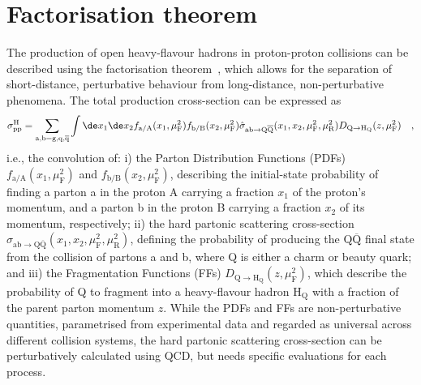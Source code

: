 \section{Factorisation theorem}
The production of open heavy-flavour hadrons in proton-proton collisions can be described using the factorisation theorem~\cite{Collins:1989gx}, which allows for the separation of short-distance, perturbative behaviour from long-distance, non-perturbative phenomena. The total production cross-section can be expressed as
\begin{equation}\label{eq:pp_xsec}
    \sigma_{\text{pp}}^\mathrm{H} = \sum_\mathrm{a,b = g, q, \overline{q}} \int \de x_1 \de x_2 f_\mathrm{a/A}(x_1,\mu_\mathrm{F}^2) f_\mathrm{b/B}(x_2,\mu_\mathrm{F}^2) \hat{\sigma}_\mathrm{ab \rightarrow Q\overline{Q}} (x_1,x_2,\mu_\mathrm{F}^2,\mu_\mathrm{R}^2) D_\mathrm{Q\rightarrow H_Q}(z,\mu_\mathrm{F}^2) \quad ,
\end{equation}
i.e., the convolution of: i) the Parton Distribution Functions (PDFs) $f_\mathrm{a/A}(x_1,\mu_\mathrm{F}^2)$ and $f_\mathrm{b/B}(x_2,\mu_\mathrm{F}^2)$, describing the initial-state probability of finding a parton a in the proton A carrying a fraction $x_1$ of the proton's momentum, and a parton b in the proton B carrying a fraction $x_2$ of its momentum, respectively; ii) the hard partonic scattering cross-section $\hat{\sigma}_\mathrm{ab \rightarrow Q\overline{Q}} (x_1,x_2,\mu_\mathrm{F}^2,\mu_\mathrm{R}^2)$, defining the probability of producing the $\mathrm{Q\overline{Q}}$ final state from the collision of partons a and b, where Q is either a charm or beauty quark; and iii) the Fragmentation Functions (FFs) $D_\mathrm{Q\rightarrow H_Q}(z,\mu_\mathrm{F}^2)$, which describe the probability of Q to fragment into a heavy-flavour hadron $\mathrm{H_Q}$ with a fraction of the parent parton momentum $z$. While the PDFs and FFs are non-perturbative quantities, parametrised from experimental data and regarded as universal across different collision systems, the hard partonic scattering cross-section can be perturbatively calculated using QCD, but needs specific evaluations for each process. 

